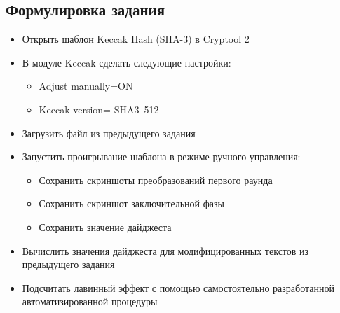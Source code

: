 \documentclass[a4paper, 14pt]{extarticle}
\begin{document}
\subsection{Формулировка задания}
\begin{itemize}
    \item  Открыть шаблон Keccak Hash (SHA-3) в Cryptool 2
    \item  В модуле Keccak сделать следующие настройки:
    \begin{itemize}
        \item  Adjust manually=ON
        \item  Keccak version= SHA3--512
    \end{itemize}
    \item  Загрузить файл из предыдущего задания
    \item  Запустить проигрывание шаблона в режиме ручного управления:
    \begin{itemize}
        \item  Сохранить скриншоты преобразований первого раунда
        \item  Сохранить скриншот заключительной фазы
        \item  Сохранить значение дайджеста
    \end{itemize}
    \item  Вычислить значения дайджеста для модифицированных текстов из предыдущего задания
    \item  Подсчитать лавинный эффект с помощью самостоятельно разработанной автоматизированной процедуры
\end{itemize}
\end{document}
